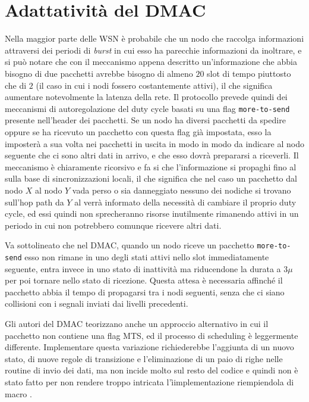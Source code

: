 \documentclass[twoside,11pt,a4paper,italian,openany]{book}
\begin{document}
\section{Adattatività del DMAC}
Nella maggior parte delle WSN è probabile che un nodo che raccolga informazioni attraversi dei
periodi di \emph{burst} in cui esso ha parecchie informazioni da inoltrare, e si può notare che 
con il meccanismo appena descritto un'informazione che abbia bisogno di due pacchetti avrebbe 
bisogno di almeno $20$ slot di tempo piuttosto che di $2$ (il caso in cui i nodi fossero 
costantemente attivi), il che significa aumentare notevolmente la latenza della rete. 
Il protocollo prevede quindi dei meccanismi di autoregolazione del duty cycle basati su una flag 
\texttt{more-to-send} presente nell'header dei pacchetti. 
Se un nodo ha diversi pacchetti da spedire oppure se ha ricevuto un pacchetto con questa flag
già impostata, esso la imposterà a sua volta nei pacchetti in uscita in modo in modo da 
indicare al nodo seguente che ci sono altri dati in arrivo, e che esso dovrà prepararsi a 
riceverli. Il meccanismo è chiaramente ricorsivo e fa si che l'informazione si propaghi fino 
al \sink sulla base di sincronizzazioni locali, il che significa che nel caso un pacchetto dal 
nodo $X$ al nodo $Y$ vada perso o sia danneggiato nessuno dei nodiche si trovano sull'hop path da
$Y$ al \sink verrà informato della necessità di cambiare il proprio duty cycle, ed essi quindi 
non sprecheranno risorse inutilmente rimanendo attivi in un periodo in cui non potrebbero 
comunque ricevere altri dati. 


Va sottolineato che nel DMAC, quando un nodo riceve un pacchetto \texttt{more-to-send} esso non 
rimane in uno degli stati attivi nello slot immediatamente seguente, entra invece in uno stato di
inattività ma riducendone la durata a  
$3\mu$ per poi tornare nello stato di ricezione. Questa attesa è necessaria affinché il 
pacchetto abbia il tempo di propagarsi tra i nodi seguenti, senza che ci siano collisioni con i
segnali inviati dai livelli precedenti. 

Gli autori del DMAC teorizzano anche un approccio alternativo in cui il pacchetto non contiene 
una flag MTS,  ed il processo di scheduling è leggermente differente. 
Implementare questa variazione richiederebbe l'aggiunta di un nuovo stato, di 
nuove regole di transizione e l'eliminazione di un paio di righe nelle routine di invio dei dati,
ma non incide molto sul resto del codice e quindi non è stato fatto per non rendere troppo 
intricata l'ìimplementazione riempiendola di macro . 
\end{document}
